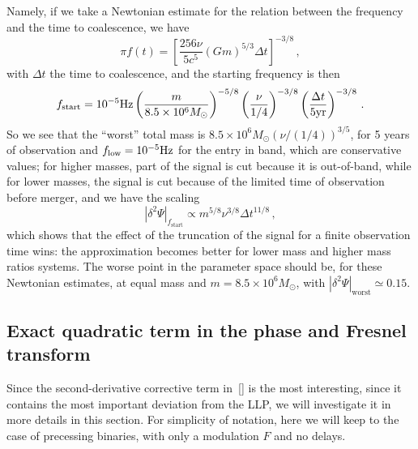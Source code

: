\documentclass[aps,showpacs,%
prd,superscriptaddress,nofootinbib]{revtex4}
\newcommand{\be}{\begin{equation}}
\newcommand{\ee}{\end{equation}}
\newcommand{\Msol}{M_{\odot}}
\begin{document}
Namely, if we take a Newtonian estimate for the relation between the frequency and the time to coalescence, we have
%
\be
	\pi f(t) = \left[ \frac{256\nu}{5c^{5}} (Gm)^{5/3} \Delta t \right]^{-3/8} \,,
\ee
%
with $\Delta t$ the time to coalescence, and the starting frequency is then
%
\be
	f_{\rm start} = 10^{-5}\mathrm{Hz} \left( \frac{m}{8.5\times10^{6}\Msol} \right)^{-5/8} \left( \frac{\nu}{1/4} \right)^{-3/8} \left( \frac{\Delta t}{5 \mathrm{yr}} \right)^{-3/8} \,.
\ee
%
So we see that the ``worst'' total mass is $8.5\times10^6\Msol (\nu/(1/4))^{3/5}$, for 5 years of observation and $f_{\rm low} = 10^{-5}\mathrm{Hz}$ for the entry in band, which are conservative values; for higher masses, part of the signal is cut because it is out-of-band, while for lower masses, the signal is cut because of the limited time of observation before merger, and we have the scaling
%
\be
	|\delta^{2}\Psi |_{f_\mathrm{start}} \propto m^{5/8}\nu^{3/8}\Delta t^{11/8} \,,
\ee
%
which shows that the effect of the truncation of the signal for a finite observation time wins: the approximation becomes better for lower mass and higher mass ratios systems. The worse point in the parameter space should be, for these Newtonian estimates, at equal mass and $m=8.5\times 10^{6} \Msol$, with $|\delta^{2}\Psi |_{\mathrm{worst}} \simeq 0.15$.


\subsection{Exact quadratic term in the phase and Fresnel transform}
\label{subsec:fresneltransform}

Since the second-derivative corrective term in~\eqref{} is the most interesting, since it contains the most important deviation from the LLP, we will investigate it in more details in this section. For simplicity of notation, here we will keep to the case of precessing binaries, with only a modulation $F$ and no delays.
\end{document}
